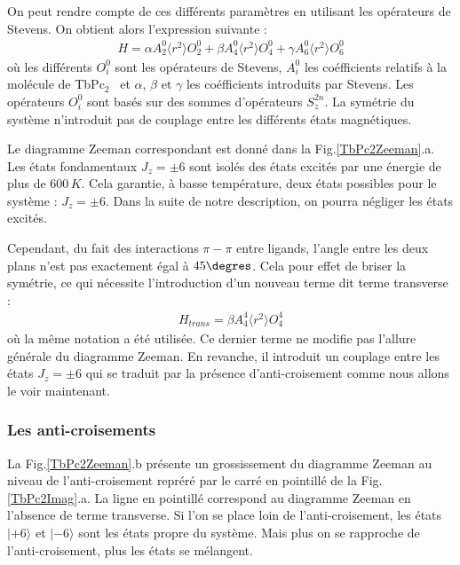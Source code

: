 On peut rendre compte de ces différents paramètres en utilisant les opérateurs de Stevens. On obtient alors l'expression suivante :
\begin{eqnarray}
H = \alpha A_2^0 \langle r^2 \rangle O_2^0 + \beta A_4^0 \langle r^2 \rangle O_4^0 + \gamma A_6^0 \langle r^2 \rangle O_6^0
\end{eqnarray}
où les différents $O_i^0$ sont les opérateurs de Stevens, $A_i^0$ les coéfficients relatifs à la molécule de TbPc$_2$~\cite{Ishikawa2005} et $\alpha$, $\beta$ et $\gamma$ les coéfficients introduits par Stevens. Les opérateurs $O^0_i$ sont basés sur des sommes d'opérateurs $S_z^{2n}$. La symétrie du système n'introduit pas de couplage entre les différents états magnétiques. 

Le diagramme Zeeman correspondant est donné dans la Fig.\ref{TbPc2Zeeman}.a. Les états fondamentaux $J_z = \pm 6$ sont isolés des états excités par une énergie de plus de $600\,K$. Cela garantie, à basse température, deux états possibles pour le système : $J_z = \pm 6$. Dans la suite de notre description, on pourra négliger les états excités.

 
Cependant, du fait des interactions $\pi - \pi$ entre ligands, l'angle entre les deux plans n'est pas exactement égal à $45\degres$. Cela pour effet de briser la symétrie, ce qui nécessite l'introduction d'un nouveau terme dit terme transverse :
\begin{eqnarray}
H_{trans} = \beta A_4^4 \langle r^2 \rangle O_4^4
\end{eqnarray}
où la m\^eme notation a été utilisée. Ce dernier terme ne modifie pas l'allure générale du diagramme Zeeman. En revanche, il introduit un couplage entre les états  $J_z = \pm 6$ qui se traduit par la présence d'anti-croisement comme nous allons le voir maintenant.

\subsubsection{Les anti-croisements}
La Fig.\ref{TbPc2Zeeman}.b présente un grossissement du diagramme Zeeman au niveau de l'anti-croisement repréré par le carré en pointillé de la Fig.\ref{TbPc2Imag}.a. La ligne en pointillé correspond au diagramme Zeeman en l'absence de terme transverse. Si l'on se place loin de l'anti-croisement, les états $|+6\rangle$ et $|-6\rangle$ sont les états propre du système. Mais plus on se rapproche de l'anti-croisement, plus les états se mélangent.

